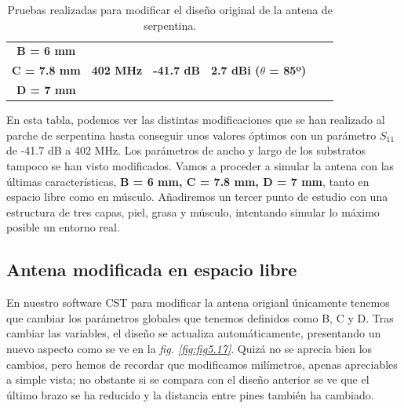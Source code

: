 \begin{table}[h]
{\begin{tabular}{| c | c | c | c | c | c |}
            \hline
            \textbf{B = 6 mm}             &                                   &                             &                                   \\
            \textbf{C = 7.8 mm}           & \textbf{402 MHz}                  & \textbf{-41.7 dB}           & \textbf{2.7 dBi ($\theta$ = 85º)} \\
            \textbf{D = 7 mm}             &                                   &                             &                                   \\
            \hline
            \hline
        \end{tabular}}
    \caption{Pruebas realizadas para modificar el diseño original de la antena de serpentina.}
    \label{tab:tabla5.4}
\end{table}

En esta tabla, podemos ver las distintas modificaciones que se han realizado al parche de serpentina hasta conseguir unos valores óptimos con un parámetro $S_{11}$ de -41.7 dB a 402 MHz. Los parámetros de ancho y largo de los substratos tampoco se han visto modificados. Vamos a proceder a simular la antena con las últimas características, \textbf{B = 6 mm, C = 7.8 mm, D = 7 mm}, tanto en espacio libre como en músculo. Añadiremos un tercer punto de estudio con una estructura de tres capas, piel, grasa y músculo, intentando simular lo máximo posible un entorno real.

\subsection{Antena modificada en espacio libre}\label{subsec:antena-modificada-en-espacio-libre}

En nuestro software CST para modificar la antena origianl únicamente tenemos que cambiar los parámetros globales que tenemos definidos como B, C y D. Tras cambiar las variables, el diseño se actualiza automáticamente, presentando un nuevo aspecto como se ve en la \textit{fig. \ref{fig:fig5.17}}. Quizá no se aprecia bien los cambios, pero hemos de recordar que modificamos milímetros, apenas apreciables a simple vista; no obstante si se compara con el diseño anterior se ve que el último brazo se ha reducido y la distancia entre pines también ha cambiado.

